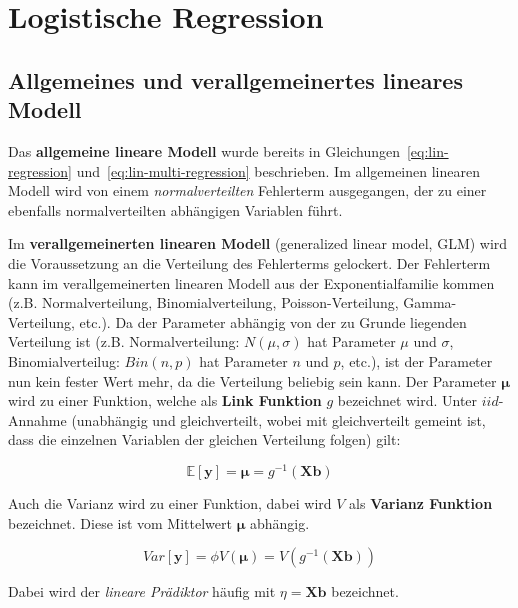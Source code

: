 \documentclass{article}
\numberwithin{equation}{section}
\begin{document}

\section{Logistische Regression}

\subsection{Allgemeines und verallgemeinertes lineares Modell}

Das \textbf{allgemeine lineare Modell} wurde bereits in Gleichungen~\ref{eq:lin-regression} und~\ref{eq:lin-multi-regression} beschrieben. Im allgemeinen linearen Modell wird von einem \emph{normalverteilten} Fehlerterm ausgegangen, der zu einer ebenfalls normalverteilten abhängigen Variablen führt.

Im \textbf{verallgemeinerten linearen Modell} (generalized linear model, GLM) wird die Voraussetzung an die Verteilung des Fehlerterms gelockert. Der Fehlerterm kann im verallgemeinerten linearen Modell aus der Exponentialfamilie kommen (z.B. Normalverteilung, Binomialverteilung, Poisson-Verteilung, Gamma-Verteilung, etc.). Da der Parameter abhängig von der zu Grunde liegenden Verteilung ist (z.B. Normalverteilung: $N(\mu,\sigma)$ hat Parameter $\mu$ und $\sigma$, Binomialverteilug: $Bin(n,p)$ hat Parameter $n$ und $p$, etc.), ist der Parameter nun kein fester Wert mehr, da die Verteilung beliebig sein kann. Der Parameter $\mathbf{\mu}$ wird zu einer Funktion, welche als \textbf{Link Funktion} $g$ bezeichnet wird. Unter $iid$-Annahme (unabhängig und gleichverteilt, wobei mit gleichverteilt gemeint ist, dass die einzelnen Variablen der gleichen Verteilung folgen) gilt:

\begin{equation}
\mathbb{E}[\mathbf{y}] = \mathbf{\mu} = g^{-1}(\mathbf{Xb})
\end{equation}

Auch die Varianz wird zu einer Funktion, dabei wird $V$ als \textbf{Varianz Funktion} bezeichnet. Diese ist vom Mittelwert $\mathbf{\mu}$ abhängig.

\begin{equation}
Var[\mathbf{y}] = \phi V(\mathbf{\mu}) = V(g^{-1}(\mathbf{Xb}))
\end{equation}

Dabei wird der \emph{lineare Prädiktor} häufig mit $\eta = \mathbf{Xb}$ bezeichnet.
\end{document}
